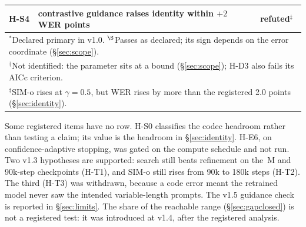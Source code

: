 \begin{center}
\begin{tabular}{lll}
    H-S4 & contrastive guidance raises identity within $+2$ WER points & \textbf{refuted}$^{\ddagger}$ \\
    \midrule
    \multicolumn{3}{l}{\footnotesize $^{*}$Declared primary in v1.0. $^{\S}$Passes as declared; its
    sign depends on the error coordinate (\S\ref{sec:scope}).} \\
    \multicolumn{3}{l}{\footnotesize $^{\dagger}$Not identified: the parameter sits at a bound
    (\S\ref{sec:scope}); H-D3 also fails its AICc criterion.} \\
    \multicolumn{3}{l}{\footnotesize $^{\ddagger}$SIM-o rises at $\gamma{=}0.5$, but WER rises by
    more than the registered 2.0 points (\S\ref{sec:identity}).} \\
    \bottomrule
  \end{tabular}
\end{center}

Some registered items have no row. H-S0 classifies the codec headroom rather than testing a
claim; its value is the headroom in \S\ref{sec:identity}. H-E6, on confidence-adaptive
stopping, was gated on the compute schedule and not run. Two v1.3 hypotheses are supported:
search still beats refinement on the \NmaxNfour\,M and 90k-step checkpoints (H-T1), and
SIM-o still rises from 90k to 180k steps (H-T2). The third (H-T3) was withdrawn, because a code error meant the retrained model never saw the
intended variable-length prompts. The v1.5 guidance check is reported in
\S\ref{sec:limits}. The share of the reachable range (\S\ref{sec:gapclosed}) is not a
registered test: it was introduced at v1.4, after the registered analysis.
